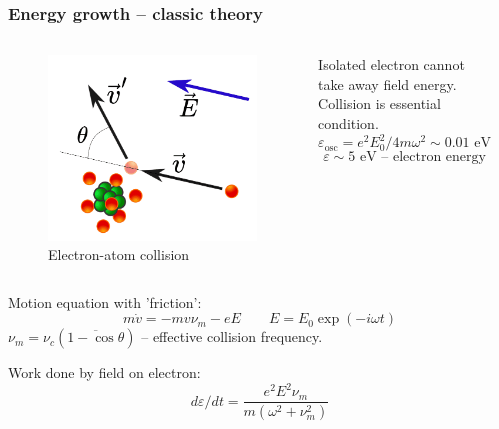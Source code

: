 \documentclass{beamer}
\begin{document}
	\begin{frame}
		\frametitle{Energy growth -- classic theory}
		
		
		
		\begin{columns}
			\begin{figure}
				\centering
				\includegraphics[width=0.8\linewidth]{res/collision.png}
				\caption*{Electron-atom collision}
			\end{figure}
			
			Isolated electron cannot take away field energy. Collision is essential condition.
			$$ \varepsilon_{\text{osc}} = e^2 E_0^2/4m\omega^2 \sim 0.01 \text{ eV}$$
			$$ \varepsilon \sim 5 \text{ eV} \text{ -- electron energy}$$
			\begin{center}
			\end{center}
		\end{columns}
		
		Motion equation with 'friction':
		$$ m \dot{v} = - m v \nu_m - e E \qquad E = E_0 \exp(-i \omega t)$$
		$\nu_m = \nu_c (\overline{1 - \cos \theta})$ -- effective collision frequency.
		
		Work done by field on electron:
		\begin{equation}
			\boxed{d\varepsilon/dt = \frac{e^2 E^2 \nu_m}{m (\omega^2 + \nu_m^2)}
				\label{eq:energy_growth}}
		\end{equation}
		

\end{frame}
\end{document}
